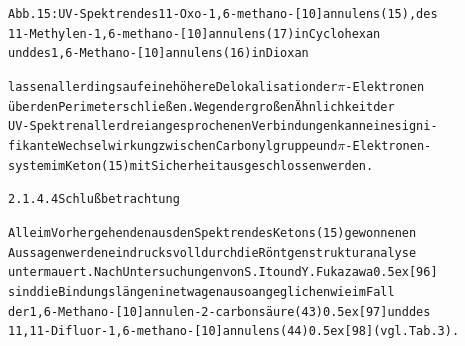 \documentclass[a4paper,11pt]{article}
\begin{document}
\begin{alltt}
Abb. 15: UV-Spektren des 11-Oxo-1,6-methano-[10]annulens (15), des
         11-Methylen-1‚6-methano-[10]annulens (17) in Cyclohexan
         und des 1,6-Methano-[10]annulens (16) in Dioxan

lassen allerdings auf eine höhere Delokalisation der \(\pi\)-Elektronen
über den Perimeter schließen. Wegen der großen Ähnlichkeit der
UV-Spektren aller drei angesprochenen Verbindungen kann eine signi-
fikante Wechselwirkung zwischen Carbonylgruppe und \(\pi\)-Elektronen-
system im Keton (15) mit Sicherheit ausgeschlossen werden.

\newpage
{}


2.1.4.4 Schlußbetrachtung

Alle im Vorhergehenden aus den Spektren des Ketons (15) gewonnenen
Aussagen werden eindrucksvoll durch die Röntgenstrukturanalyse
untermauert. Nach Untersuchungen von S. Ito und Y. Fukazawa \raise0.5ex\hbox{[96]}
sind die Bindungslängen in etwa genauso angeglichen wie im Fall
der 1,6-Methano-[10]annulen-2-carbonsäure (43) \raise0.5ex\hbox{[97]} und des
11‚11-Difluor-1,6-methano-[10]annulens (44) \raise0.5ex\hbox{[98]} (vgl. Tab. 3).

\end{alltt}
\def\atom#1#2{-[:#2,0.3,,,draw=none]{\scriptstyle#1}}
\end{document}
